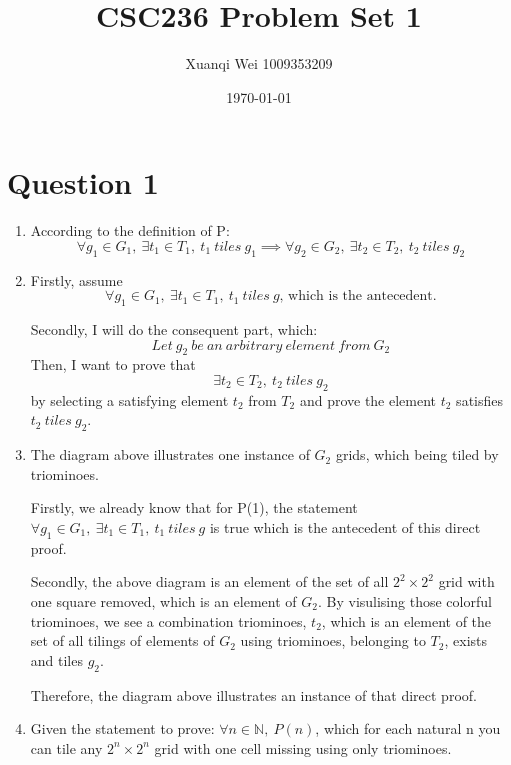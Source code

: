 \documentclass[12pt]{article}
\title{CSC236 Problem Set 1}
\author{Xuanqi Wei 1009353209}
\date{\today}
\begin{document}
\maketitle
\thispagestyle{empty}

\newpage

\tableofcontents
\thispagestyle{empty}

\newpage

\setcounter{page}{1}

\section{Question 1}
\begin{enumerate}[label=(\alph*)]
    \item According to the definition of P:
    $$\forall g_1 \in G_1,\ \exists t_1 \in T_1,\ t_1\ tiles\ g_1 \implies \forall g_2 \in G_2,\ \exists t_2 \in T_2,\ t_2\ tiles\ g_2 $$

    \item 
    Firstly, assume $$\forall g_1 \in G_1,\ \exists t_1 \in T_1,\ t_1\ tiles\ g\text{, which is the antecedent.}$$
    
    Secondly, I will do the consequent part, which: $$Let\ g_2\ be\ an\ arbitrary\ element\ from\ G_2$$ 
    Then, I want to prove that $$\exists t_2 \in T_2,\ t_2\ tiles\ g_2$$ \quad \quad \quad \quad \quad \quad \quad by selecting a satisfying element $t_2$ from $T_2$ 
    and prove the element $t_2$ satisfies $t_2\ tiles\ g_2$.

    \item The diagram above illustrates one instance of $G_2$ grids, which being tiled by triominoes.
    
    Firstly, we already know that for P(1), the statement $\forall g_1 \in G_1,\ \exists t_1 \in T_1,\ t_1\ tiles\ g$ is true which is the antecedent of this direct proof.

    Secondly, the above diagram is an element of the set of all $2^2 \times 2^2$ grid with one square removed, which is an element of $G_2$. 
    By visulising those colorful triominoes, we see a combination triominoes, $t_2$, which is an element of the set of all tilings of elements of $G_2$ using triominoes, belonging to $T_2$, exists and tiles $g_2$.

    Therefore, the diagram above illustrates an instance of that direct proof.

    \item Given the statement to prove: $\forall n \in \mathbb{N},\ P(n)$, which for each natural n you can tile any $2^n \times 2^n$ grid with one cell missing using only triominoes.
    

\end{enumerate}
\end{document}
